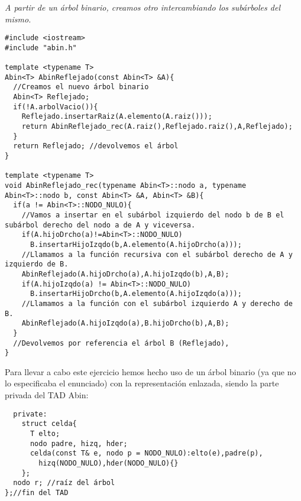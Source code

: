 \textbf{}\textit{ A partir de un árbol binario, creamos otro intercambiando los subárboles del mismo.}

\begin{verbatim}
#include <iostream>
#include "abin.h"

template <typename T>
Abin<T> AbinReflejado(const Abin<T> &A){
  //Creamos el nuevo árbol binario 
  Abin<T> Reflejado;
  if(!A.arbolVacio()){
    Reflejado.insertarRaiz(A.elemento(A.raiz()));
    return AbinReflejado_rec(A.raiz(),Reflejado.raiz(),A,Reflejado);
  }
  return Reflejado; //devolvemos el árbol
}

template <typename T>
void AbinReflejado_rec(typename Abin<T>::nodo a, typename Abin<T>::nodo b, const Abin<T> &A, Abin<T> &B){
  if(a != Abin<T>::NODO_NULO){
    //Vamos a insertar en el subárbol izquierdo del nodo b de B el subárbol derecho del nodo a de A y viceversa.
    if(A.hijoDrcho(a)!=Abin<T>::NODO_NULO)
      B.insertarHijoIzqdo(b,A.elemento(A.hijoDrcho(a)));
    //Llamamos a la función recursiva con el subárbol derecho de A y izquierdo de B.
    AbinReflejado(A.hijoDrcho(a),A.hijoIzqdo(b),A,B);
    if(A.hijoIzqdo(a) != Abin<T>::NODO_NULO)
      B.insertarHijoDrcho(b,A.elemento(A.hijoIzqdo(a)));
    //Llamamos a la función con el subárbol izquierdo A y derecho de B.
    AbinReflejado(A.hijoIzqdo(a),B.hijoDrcho(b),A,B);
  }
  //Devolvemos por referencia el árbol B (Reflejado),
}
\end{verbatim}

\newpage
Para llevar a cabo este ejercicio hemos hecho uso de un árbol binario (ya que no lo especificaba el enunciado) con la representación enlazada, siendo la parte privada del TAD Abin:
\begin{center}
  \begin{verbatim}
  private:
    struct celda{
      T elto;
      nodo padre, hizq, hder;
      celda(const T& e, nodo p = NODO_NULO):elto(e),padre(p),
        hizq(NODO_NULO),hder(NODO_NULO){}
    };
  nodo r; //raíz del árbol
};//fin del TAD
  \end{verbatim}
\end{center}

